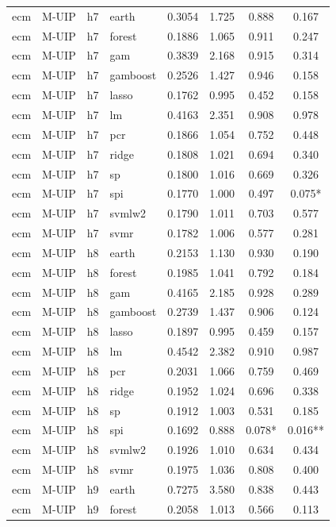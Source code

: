 \begin{ThreePartTable}
\begin{longtable}[t]{llclcccc}
\addlinespace
ecm & M-UIP & h7 & earth & 0.3054 & 1.725 & 0.888 & 0.167\\
ecm & M-UIP & h7 & forest & 0.1886 & 1.065 & 0.911 & 0.247\\
ecm & M-UIP & h7 & gam & 0.3839 & 2.168 & 0.915 & 0.314\\
ecm & M-UIP & h7 & gamboost & 0.2526 & 1.427 & 0.946 & 0.158\\
ecm & M-UIP & h7 & lasso & 0.1762 & 0.995 & 0.452 & 0.158\\
ecm & M-UIP & h7 & lm & 0.4163 & 2.351 & 0.908 & 0.978\\
ecm & M-UIP & h7 & pcr & 0.1866 & 1.054 & 0.752 & 0.448\\
ecm & M-UIP & h7 & ridge & 0.1808 & 1.021 & 0.694 & 0.340\\
ecm & M-UIP & h7 & sp & 0.1800 & 1.016 & 0.669 & 0.326\\
ecm & M-UIP & h7 & spi & 0.1770 & 1.000 & 0.497 & 0.075*\\
ecm & M-UIP & h7 & svmlw2 & 0.1790 & 1.011 & 0.703 & 0.577\\
ecm & M-UIP & h7 & svmr & 0.1782 & 1.006 & 0.577 & 0.281\\
\addlinespace
ecm & M-UIP & h8 & earth & 0.2153 & 1.130 & 0.930 & 0.190\\
ecm & M-UIP & h8 & forest & 0.1985 & 1.041 & 0.792 & 0.184\\
ecm & M-UIP & h8 & gam & 0.4165 & 2.185 & 0.928 & 0.289\\
ecm & M-UIP & h8 & gamboost & 0.2739 & 1.437 & 0.906 & 0.124\\
ecm & M-UIP & h8 & lasso & 0.1897 & 0.995 & 0.459 & 0.157\\
ecm & M-UIP & h8 & lm & 0.4542 & 2.382 & 0.910 & 0.987\\
ecm & M-UIP & h8 & pcr & 0.2031 & 1.066 & 0.759 & 0.469\\
ecm & M-UIP & h8 & ridge & 0.1952 & 1.024 & 0.696 & 0.338\\
ecm & M-UIP & h8 & sp & 0.1912 & 1.003 & 0.531 & 0.185\\
ecm & M-UIP & h8 & spi & 0.1692 & 0.888 & 0.078* & 0.016**\\
ecm & M-UIP & h8 & svmlw2 & 0.1926 & 1.010 & 0.634 & 0.434\\
ecm & M-UIP & h8 & svmr & 0.1975 & 1.036 & 0.808 & 0.400\\
\addlinespace
ecm & M-UIP & h9 & earth & 0.7275 & 3.580 & 0.838 & 0.443\\
ecm & M-UIP & h9 & forest & 0.2058 & 1.013 & 0.566 & 0.113\\

\end{longtable}
\end{ThreePartTable}
